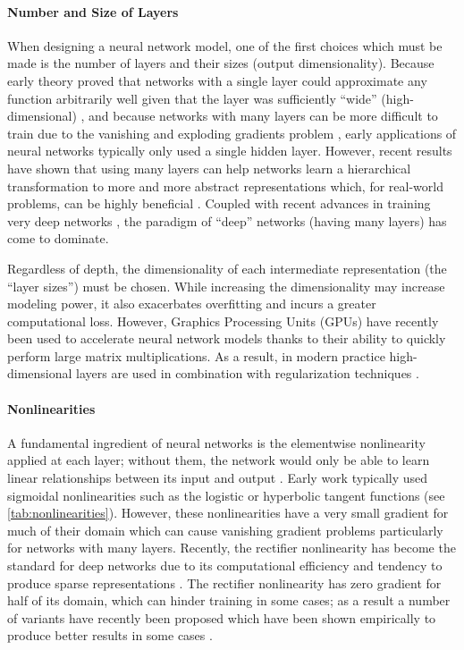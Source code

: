 \paragraph{Number and Size of Layers}

When designing a neural network model, one of the first choices which must be made is the number of layers and their sizes (output dimensionality).
Because early theory proved that networks with a single layer could approximate any function arbitrarily well given that the layer was sufficiently ``wide'' (high-dimensional) \cite{}, and because networks with many layers can be more difficult to train due to the vanishing and exploding gradients problem \cite{}, early applications of neural networks typically only used a single hidden layer.
However, recent results have shown that using many layers can help networks learn a hierarchical transformation to more and more abstract representations which, for real-world problems, can be highly beneficial \cite{}.
Coupled with recent advances in training very deep networks \cite{}, the paradigm of ``deep'' networks (having many layers) has come to dominate.

Regardless of depth, the dimensionality of each intermediate representation (the ``layer sizes'') must be chosen.
While increasing the dimensionality may increase modeling power, it also exacerbates overfitting and incurs a greater computational loss.
However, Graphics Processing Units (GPUs) have recently been used to accelerate neural network models thanks to their ability to quickly perform large matrix multiplications.
As a result, in modern practice high-dimensional layers are used in combination with regularization techniques \cite{}.

\paragraph{Nonlinearities}

A fundamental ingredient of neural networks is the elementwise nonlinearity applied at each layer; without them, the network would only be able to learn linear relationships between its input and output \cite{}.
Early work typically used sigmoidal nonlinearities such as the logistic or hyperbolic tangent functions (see \cref{tab:nonlinearities}).
However, these nonlinearities have a very small gradient for much of their domain which can cause vanishing gradient problems particularly for networks with many layers.
Recently, the rectifier nonlinearity has become the standard for deep networks due to its computational efficiency and tendency to produce sparse representations \cite{}.
The rectifier nonlinearity has zero gradient for half of its domain, which can hinder training in some cases; as a result a number of variants have recently been proposed which have been shown empirically to produce better results in some cases \cite{}.

